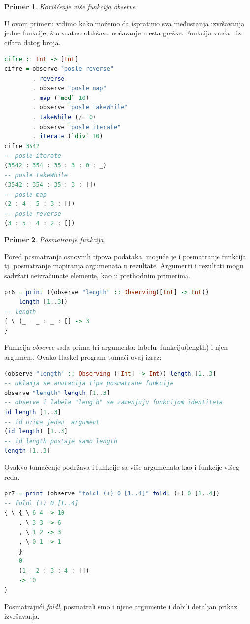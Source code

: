 \documentclass[a4paper]{article}
\newtheorem{primer}{Primer}[section]
\begin{document}
{{\begin{primer} 
Korišćenje više funkcija observe
\end{primer}
U ovom primeru vidimo kako možemo da ispratimo sva međustanja izvršavanja jedne funkcije, što znatno olakšava uočavanje mesta greške.
Funkcija vraća niz cifara datog broja.
\begin{lstlisting}[language=Haskell]
cifre :: Int -> [Int]
cifre = observe "posle reverse" 
		. reverse
		. observe "posle map"
		. map (`mod` 10)
		. observe "posle takeWhile"
		. takeWhile (/= 0)
		. observe "posle iterate"
		. iterate (`div` 10)
cifre 3542
-- posle iterate
(3542 : 354 : 35 : 3 : 0 : _)
-- posle takeWhile
(3542 : 354 : 35 : 3 : [])
-- posle map
(2 : 4 : 5 : 3 : [])
-- posle reverse
(3 : 5 : 4 : 2 : [])
\end{lstlisting}


\begin{primer}
Posmatranje funkcija
\end{primer}
Pored posmatranja osnovnih tipova podataka, moguće je i posmatranje funkcija tj. posmatranje mapiranja argumenata u rezultate.\cite{hood}
Argumenti i rezultati mogu sadržati neizračunate elemente, kao u prethodnim primerima.
\begin{lstlisting}[language=Haskell]
pr6 = print ((observe "length" :: Observing([Int] -> Int)) 
	length [1..3])
-- length
{ \ (_ : _ : _ : [] -> 3
}
\end{lstlisting}
Funkcija {\em observe} sada prima tri argumenta: labelu, funkciju(length) i njen argument. 
Ovako Haskel program tumači ovaj izraz:
\begin{lstlisting}[language=Haskell]
(observe "length" :: Observing ([Int] -> Int)) length [1..3]
-- uklanja se anotacija tipa posmatrane funkcije
observe "length" length [1..3]
-- observe i labela "length" se zamenjuju funkcijom identiteta
id length [1..3]
-- id uzima jedan  argument
(id length) [1..3]
-- id length postaje samo length
length [1..3]
\end{lstlisting}

Ovakvo tumačenje podržava i funkcije sa više argumenata kao i funkcije višeg reda.

\begin{lstlisting}[language=Haskell]
pr7 = print (observe "foldl (+) 0 [1..4]" foldl (+) 0 [1..4])
-- foldl (+) 0 [1..4]
{ \ { \ 6 4 -> 10
    , \ 3 3 -> 6
    , \ 1 2 -> 3
    , \ 0 1 -> 1
    }
    0
    (1 : 2 : 3 : 4 : [])
    -> 10
} 
\end{lstlisting}
Posmatrajući {\em foldl}, posmatrali smo i njene argumente i dobili detaljan prikaz izvršavanja.

}}
\end{document}
